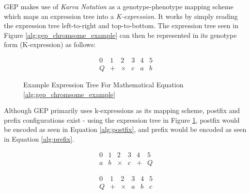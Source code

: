 \parbreak\noindent GEP makes use of \textit{Karva Notation} as a genotype-phenotype mapping scheme which maps an expression tree into a \textit{K-expression}. It works by simply reading the expression tree left-to-right and top-to-bottom. The expression tree seen in Figure \ref{alg:gep_chromsome_example} can then be represented in its genotype form (K-expression) as follows:
\begin{ceqn}
\begin{equation}
    \begin{array}{cccccc}
        0 & 1 & 2 & 3 & 4 & 5\\
        Q & + & \times & c & a & b
    \end{array}
\end{equation}
\end{ceqn}

\parbreak
\begin{figure}[H] %
	\centering %
	\caption{Example Expression Tree For Mathematical Equation \ref{alg:gep_chromsome_example}}
	\label{fig:gep_phenotype_example} %
\end{figure}
  
\parbreak\noindent Although GEP primarily uses k-expressions as its mapping scheme, postfix and prefix configurations exist - using the expression tree in Figure \ref{fig:gep_phenotype_example}, postfix would be encoded as seen in Equation \ref{alg:postfix}, and prefix would be encoded as seen in Equation \ref{alg:prefix}.
\begin{ceqn}
    \begin{equation}\label{alg:postfix}
        \begin{array}{cccccc}
            0 & 1 & 2 & 3 & 4 & 5\\
            a & b & \times & c & + & Q
        \end{array}
    \end{equation}
\end{ceqn}

\begin{ceqn}
    \begin{equation}\label{alg:prefix}
        \begin{array}{cccccc}
            0 & 1 & 2 & 3 & 4 & 5\\
            Q & + & \times & a & b & c
        \end{array}
    \end{equation}
\end{ceqn}


